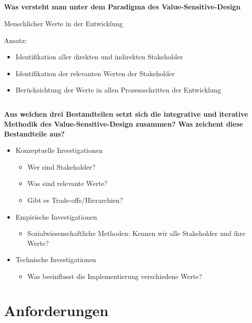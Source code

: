 \subsection{}
\textbf{Was versteht man unter dem Paradigma des Value-Sensitive-Design}

Menschlicher Werte in der Entwicklung

Ansatz:
\begin{itemize}
    \item Identifikation aller direkten und indirekten Stakeholder
    \item Identifikation der relevanten Werten der Stakeholder
    \item Berücksichtung der Werte in allen Prozessschritten der Entwicklung
\end{itemize}
\subsection{}
\textbf{Aus welchen drei Bestandteilen setzt sich die integrative und iterative Methodik des Value-Sensitive-Design zusammen? Was zeichent diese Bestandteile aus?}
\begin{itemize}
    \item Konzeptuelle Investigationen\begin{itemize}
              \item Wer sind Stakeholder?
              \item Was sind relevante Werte?
              \item Gibt es Trade-offs/Hierarchien?
          \end{itemize}
    \item Empirische Investigationen\begin{itemize}
              \item Sozialwissenschaftliche Methoden: Kennen wir alle Stakeholder und ihre Werte?
          \end{itemize}
    \item Technische Investigationen\begin{itemize}
              \item Was beeinflusst die Implementierung verschiedene Werte?
          \end{itemize}
\end{itemize}

\section{Anforderungen}
